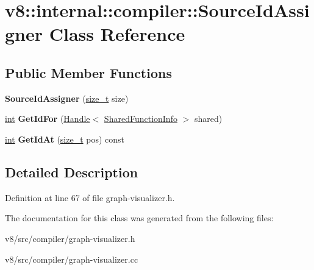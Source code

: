 \hypertarget{classv8_1_1internal_1_1compiler_1_1SourceIdAssigner}{}\section{v8\+:\+:internal\+:\+:compiler\+:\+:Source\+Id\+Assigner Class Reference}
\label{classv8_1_1internal_1_1compiler_1_1SourceIdAssigner}
\subsection*{Public Member Functions}
\begin{DoxyCompactItemize}
\item 
\mbox{\label{classv8_1_1internal_1_1compiler_1_1SourceIdAssigner_a34f18cfe242265b952a0ddbfcc116ba3}} 
{\bfseries Source\+Id\+Assigner} (\mbox{\hyperlink{classsize__t}{size\+\_\+t}} size)
\item 
\mbox{\label{classv8_1_1internal_1_1compiler_1_1SourceIdAssigner_a34762972d6f9b21384a9b4d2681e369f}} 
\mbox{\hyperlink{classint}{int}} {\bfseries Get\+Id\+For} (\mbox{\hyperlink{classv8_1_1internal_1_1Handle}{Handle}}$<$ \mbox{\hyperlink{classv8_1_1internal_1_1SharedFunctionInfo}{Shared\+Function\+Info}} $>$ shared)
\item 
\mbox{\label{classv8_1_1internal_1_1compiler_1_1SourceIdAssigner_a7b03cc5fe8e1a4887e4394cc5e473460}} 
\mbox{\hyperlink{classint}{int}} {\bfseries Get\+Id\+At} (\mbox{\hyperlink{classsize__t}{size\+\_\+t}} pos) const
\end{DoxyCompactItemize}


\subsection{Detailed Description}


Definition at line 67 of file graph-\/visualizer.\+h.



The documentation for this class was generated from the following files\+:\begin{DoxyCompactItemize}
\item 
v8/src/compiler/graph-\/visualizer.\+h\item 
v8/src/compiler/graph-\/visualizer.\+cc\end{DoxyCompactItemize}
